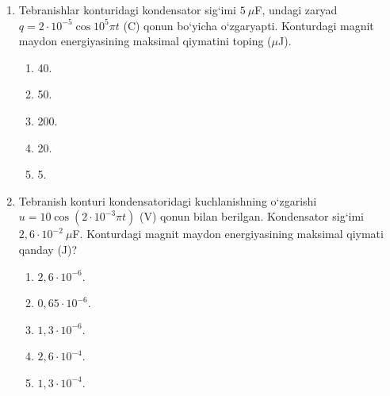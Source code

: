 \begin{enumerate}

\begin{enumerate}[label=\Alph*)]
\item 0.
\item $LI^2/2$.
\item $LI_m^2/2$.
\item $q_m^2/2C$.
\item aniqlab bo‘lmaydi.
\end{enumerate}

\item Tebranishlar konturidagi kondensator sig‘imi $5~\mu$F, undagi zaryad $q=2\cdot10^{-5}\cos10^5\pi t$ (C) qonun bo‘yicha o‘zgaryapti. Konturdagi magnit maydon energiyasining maksimal qiymatini toping ($\mu$J).
\begin{enumerate}[label=\Alph*)]
\item 40.
\item 50.
\item 200.
\item 20.
\item 5.
\end{enumerate}

\item Tebranish konturi kondensatoridagi kuchlanishning o‘zgarishi $u=10\cos(2\cdot10^{-3}\pi t)$ (V) qonun bilan berilgan. Kondensator sig‘imi $2,6\cdot10^{-2}~\mu$F. Konturdagi magnit maydon energiyasining maksimal qiymati qanday (J)?
\begin{enumerate}[label=\Alph*)]
\item $2,6\cdot10^{-6}$.
\item $0,65\cdot10^{-6}$.
\item $1,3\cdot10^{-6}$.
\item $2,6\cdot10^{-4}$.
\item $1,3\cdot10^{-4}$.
\end{enumerate}


\end{enumerate}
